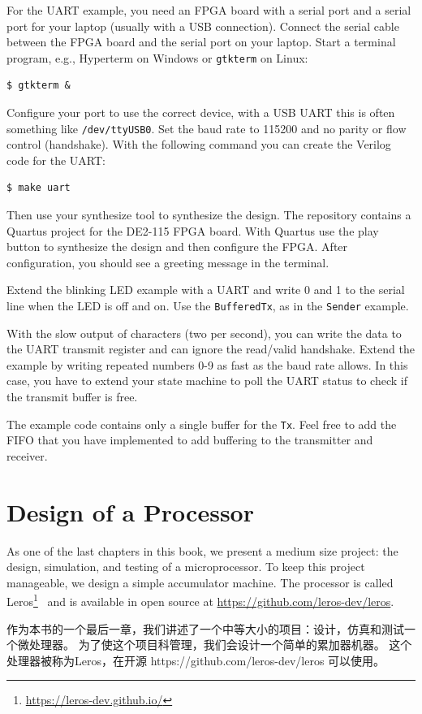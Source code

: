 \documentclass[%
    10pt,
    headinclude, footexclude,
    openright, %
    notitlepage,
    cleardoubleempty,
    headsepline,
    pointlessnumbers,
    bibtotoc, idxtotoc,
    ]{scrbook}
\newcommand{\code}[1]{{\small{\texttt{#1}}}}
\newcommand{\myref}[2]{\href{#1}{#2}}
\renewcommand{\myref}[2]{{#2}{\footnote{\url{#1}}}}
\begin{document}
{For the UART example, you need an FPGA board with a serial port and
a serial port for your laptop (usually with a USB connection).
Connect the serial cable between the FPGA board and the serial port on
your laptop. Start a terminal program, e.g., Hyperterm on Windows
or \code{gtkterm} on Linux:
\begin{verbatim}
$ gtkterm &
\end{verbatim}
Configure your port to use the correct device, with a USB UART this
is often something like \code{/dev/ttyUSB0}. Set the baud rate to 115200
and no parity or flow control (handshake).
With the following command you can create the Verilog code for the UART:
\begin{verbatim}
$ make uart
\end{verbatim}
Then use your synthesize tool to synthesize the design.
The repository contains a Quartus project for the DE2-115 FPGA board.
With Quartus use the play button to synthesize the design and then configure
the FPGA.
After configuration, you should see a greeting message in the terminal.

Extend the blinking LED example with a UART and write 0 and 1 to the serial
line when the LED is off and on. Use the \code{BufferedTx}, as in the \code{Sender}
example.

With the slow output of characters (two per second), you can write the data
to the UART transmit register and can ignore the read/valid handshake.
Extend the example by writing repeated numbers 0-9 as fast as the baud rate allows.
In this case, you have to extend your state machine to poll the UART status
to check if the transmit buffer is free.

The example code contains only a single buffer for the \code{Tx}. Feel free to
add the FIFO that you have implemented to add buffering to the transmitter
and receiver. 

\chapter{Design of a Processor}

As one of the last chapters in this book, we present a medium size project:
the design, simulation, and testing of a microprocessor.
To keep this project manageable, we design a simple accumulator machine.
The processor is called \myref{https://leros-dev.github.io/}{Leros}~\cite{leros:arcs2019}
and is available in open source at \url{https://github.com/leros-dev/leros}.

作为本书的一个最后一章，我们讲述了一个中等大小的项目：设计，仿真和测试一个微处理器。
为了使这个项目科管理，我们会设计一个简单的累加器机器。
这个处理器被称为Leros，在开源 https://github.com/leros-dev/leros 可以使用。

}
\end{document}
